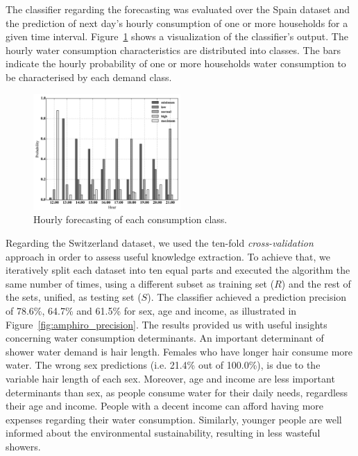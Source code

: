 The classifier regarding the forecasting was evaluated over the Spain dataset and the prediction of next day's hourly consumption of one or more households for a given time interval. Figure~\ref{fig:example} shows a visualization of the classifier's output. The hourly water consumption characteristics are distributed into classes. The bars indicate the hourly probability of one or more households water consumption to be characterised by each demand class. 

\begin{figure}[htbp]
	\centering
	\includegraphics[width=0.5\textwidth]{figures/example.pdf}
	\caption{Hourly forecasting of each consumption class.}
	\label{fig:example}
\end{figure}

Regarding the Switzerland dataset, we used the ten-fold \textit{cross-validation} approach in order to assess useful knowledge extraction. To achieve that, we iteratively split each dataset into ten equal parts and executed the algorithm the same number of times, using a different subset as training set ($R$) and the rest of the sets, unified, as testing set ($S$). The classifier achieved a prediction precision of 78.6\%, 64.7\% and 61.5\% for sex, age and income, as illustrated in Figure~\ref{fig:amphiro_precision}. The results provided us with useful insights concerning water consumption determinants. An important determinant of shower water demand is hair length. Females who have longer hair consume more water. The wrong sex predictions (i.e. 21.4\% out of 100.0\%), is due to the variable hair length of each sex. Moreover, age and income are less important determinants than sex, as people consume water for their daily needs, regardless their age and income. People with a decent income can afford having more expenses regarding their water consumption. Similarly, younger people are well informed about the environmental sustainability, resulting in less wasteful showers.

